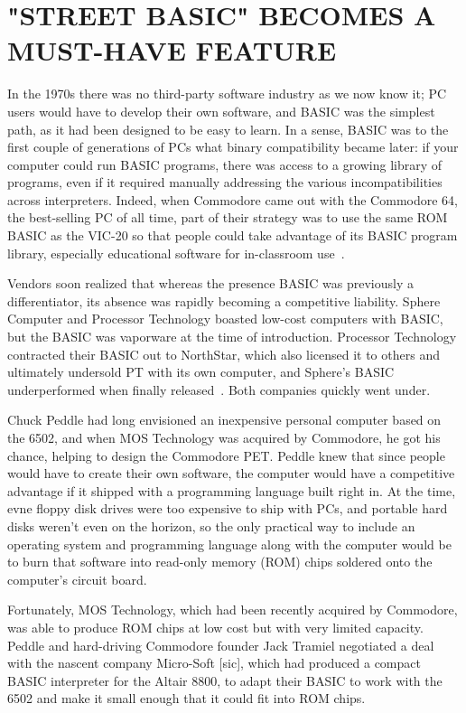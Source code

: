 
\section{"STREET BASIC" BECOMES A MUST-HAVE FEATURE}

In the 1970s there was no third-party software industry as we now know
it; PC users would have to develop their own software, and BASIC was the
simplest path, as it had been designed to be easy to learn.  In a sense,
BASIC was to the first couple of generations of PCs what binary
compatibility became later: if your computer could run BASIC programs,
there was access to a growing library of programs, even if it required
manually addressing the various incompatibilities across interpreters.
Indeed, when Commodore came out with the Commodore 64, the best-selling
PC of all time, part of their strategy was to use the same ROM BASIC as
the VIC-20 so that people could take advantage of its BASIC program
library, especially educational software for in-classroom
use~\cite[p. 414]{commodore}. 

Vendors soon realized that whereas the presence  BASIC was previously a
differentiator, its absence was rapidly becoming a 
competitive liability.  Sphere Computer and Processor Technology
boasted low-cost computers with BASIC, but the BASIC was
vaporware at the time of introduction.  Processor Technology 
contracted their BASIC out to NorthStar, which also licensed it to
others and ultimately undersold PT with its own computer,
and Sphere's BASIC underperformed when finally
released~\cite[p. 114, 134]{veit}.  Both companies quickly went under.


Chuck Peddle had long envisioned an inexpensive personal computer based on
the 6502, and when MOS
Technology was acquired by Commodore, he got his chance, helping to
design the Commodore PET.
Peddle knew that since people would have to create their own software,
the computer would have a competitive advantage if it shipped with a
programming language built right in.  At the time, evne floppy disk
drives were too expensive to ship with PCs, and portable hard disks
weren't even on the horizon, so the only practical way to include an operating
system and programming language along with the computer would be to burn
that software into read-only memory
(ROM) chips soldered onto the computer's circuit board.

Fortunately, MOS Technology, which had been recently acquired by
Commodore, was able to produce ROM chips at low cost but with very
limited capacity.
Peddle and hard-driving Commodore founder Jack Tramiel negotiated a
deal with the nascent company Micro-Soft [sic], which had produced a
compact BASIC interpreter for the Altair 8800,
to adapt their BASIC to work with the 6502 
and make it small enough that it could fit into ROM chips.

